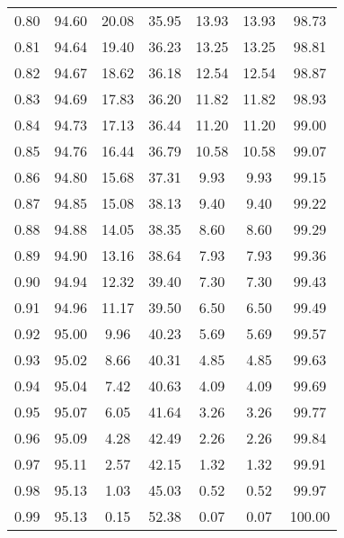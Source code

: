 \begin{tabular}{|c|c|c|c|c|c|c|}
      0.80 &     94.60 &     20.08 &      35.95 &   13.93 &      13.93 &         98.73 \\
      0.81 &     94.64 &     19.40 &      36.23 &   13.25 &      13.25 &         98.81 \\
      0.82 &     94.67 &     18.62 &      36.18 &   12.54 &      12.54 &         98.87 \\
      0.83 &     94.69 &     17.83 &      36.20 &   11.82 &      11.82 &         98.93 \\
      0.84 &     94.73 &     17.13 &      36.44 &   11.20 &      11.20 &         99.00 \\
      0.85 &     94.76 &     16.44 &      36.79 &   10.58 &      10.58 &         99.07 \\
      0.86 &     94.80 &     15.68 &      37.31 &    9.93 &       9.93 &         99.15 \\
      0.87 &     94.85 &     15.08 &      38.13 &    9.40 &       9.40 &         99.22 \\
      0.88 &     94.88 &     14.05 &      38.35 &    8.60 &       8.60 &         99.29 \\
      0.89 &     94.90 &     13.16 &      38.64 &    7.93 &       7.93 &         99.36 \\
      0.90 &     94.94 &     12.32 &      39.40 &    7.30 &       7.30 &         99.43 \\
      0.91 &     94.96 &     11.17 &      39.50 &    6.50 &       6.50 &         99.49 \\
      0.92 &     95.00 &      9.96 &      40.23 &    5.69 &       5.69 &         99.57 \\
      0.93 &     95.02 &      8.66 &      40.31 &    4.85 &       4.85 &         99.63 \\
      0.94 &     95.04 &      7.42 &      40.63 &    4.09 &       4.09 &         99.69 \\
      0.95 &     95.07 &      6.05 &      41.64 &    3.26 &       3.26 &         99.77 \\
      0.96 &     95.09 &      4.28 &      42.49 &    2.26 &       2.26 &         99.84 \\
      0.97 &     95.11 &      2.57 &      42.15 &    1.32 &       1.32 &         99.91 \\
      0.98 &     95.13 &      1.03 &      45.03 &    0.52 &       0.52 &         99.97 \\
      0.99 &     95.13 &      0.15 &      52.38 &    0.07 &       0.07 &        100.00 \\
\bottomrule
\end{tabular}
